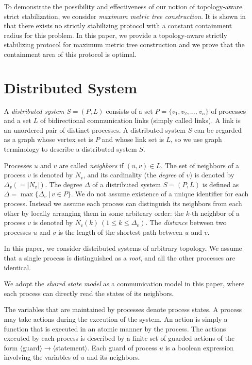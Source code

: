 \documentclass[11pt]{article}
\begin{document}
To demonstrate the possibility and effectiveness of our notion of topology-aware strict stabilization, we consider \emph{maximum metric tree construction}. It is shown in \cite{NA02c} that there exists no strictly stabilizing protocol with a constant containment radius for this problem. In this paper, we provide a topology-aware strictly stabilizing protocol for maximum metric tree construction and we prove that the containment area of this protocol is optimal.

\section{Distributed System}

A \emph{distributed system} $S=(P,L)$ consists of a set
$P=\{v_1,v_2,\ldots,v_n\}$ of processes and a set $L$ of
bidirectional communication links (simply called links).
A link is an unordered pair of distinct processes.
A distributed system $S$ can be regarded as a graph whose vertex set is $P$
and whose link set is $L$, so we use graph terminology to describe a
distributed system $S$.

Processes $u$ and $v$ are called \emph{neighbors} if $(u,v)\in L$.
The set of neighbors of a process $v$ is denoted by $N_v$, and its
cardinality (the \emph{degree} of $v$) is denoted by $\Delta_v (=|N_v|)$.
The degree $\Delta$ of a distributed system $S=(P,L)$ is defined as
$\Delta = \max \{\Delta_v\ |\ v \in P\}$.
We do not assume existence of a unique identifier for each process.
Instead we assume each process can distinguish its neighbors from each other
by locally arranging them in some arbitrary order:
the $k$-th neighbor of a process $v$ is denoted by
$N_v(k)\ (1 \le k \le \Delta_v)$. The \emph{distance} between two processes
$u$ and $v$ is the length of the shortest path between $u$ and $v$.

In this paper, we consider distributed systems of arbitrary topology.
We assume that a single process is distinguished as a \emph{root},
and all the other processes are identical.

We adopt the \emph{shared state model} as a communication model
in this paper, where each process can directly read the states
of its neighbors.

The variables that are maintained by processes denote process states.
A process may take actions during the execution of the system. An
action is simply a function that is executed in an atomic manner
by the process.
The actions executed by each process is described by a finite set
of guarded actions of the form
$\langle$guard$\rangle\longrightarrow\langle$statement$\rangle$.
Each guard of process $u$ is a boolean expression involving
the variables of $u$ and its neighbors.
\end{document}

